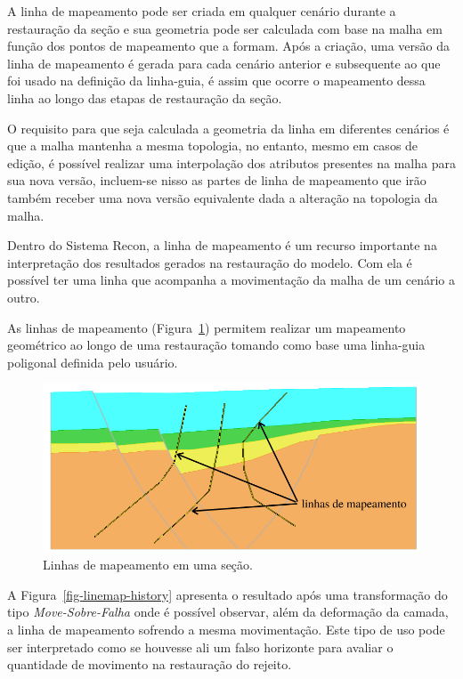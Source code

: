 A linha de mapeamento pode ser criada em qualquer cenário durante a restauração da seção e sua geometria pode ser calculada com base na malha em função dos pontos de mapeamento que a formam. Após a criação, uma versão da linha de mapeamento é gerada para cada cenário anterior e subsequente ao que foi usado na definição da linha-guia, é assim que 
ocorre o mapeamento dessa linha ao longo das etapas de restauração da seção.

O requisito para que seja calculada a geometria da linha em diferentes cenários é que a malha mantenha a mesma topologia, no entanto, mesmo em casos de edição, é possível realizar uma interpolação dos atributos presentes na malha para sua nova versão, incluem-se nisso as partes de linha de mapeamento que irão também receber uma nova versão equivalente dada a alteração na topologia da malha.

Dentro do Sistema Recon, a linha de mapeamento é um recurso importante na interpretação dos resultados gerados na restauração do modelo. Com ela é possível ter uma linha que acompanha a movimentação da malha de um cenário a outro.

As linhas de mapeamento (Figura~\ref{fig-linemap}) permitem realizar um mapeamento geométrico ao longo de uma restauração tomando como base uma linha-guia poligonal definida pelo usuário.

\begin{figure} [h]
  \begin{center}
    \includegraphics[width=400pt]{images/fig-linhas-de-mapeamento-ed}
    \caption{Linhas de mapeamento em uma seção.}\label{fig-linemap}
  \end{center}
\end{figure}

A Figura~\ref{fig-linemap-history} apresenta o resultado após uma transformação do tipo \textit{Move-Sobre-Falha} onde é possível observar, além da deformação da camada, a linha de mapeamento sofrendo a mesma movimentação. Este tipo de uso pode ser interpretado como se houvesse ali um falso horizonte para avaliar o quantidade de movimento na restauração do rejeito.

